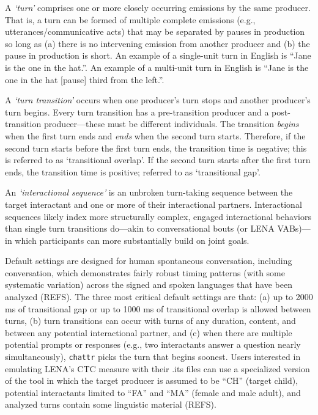 \documentclass[10pt, letterpaper]{article}
\begin{document}
A \emph{`turn'} comprises one or more closely occurring emissions by the
same producer. That is, a turn can be formed of multiple complete
emissions (e.g., utterances/communicative acts) that may be separated by
pauses in production so long as (a) there is no intervening emission
from another producer and (b) the pause in production is short. An
example of a single-unit turn in English is ``Jane is the one in the
hat.''. An example of a multi-unit turn in English is ``Jane is the one
in the hat {[}pause{]} third from the left.''.

A \emph{`turn transition'} occurs when one producer's turn stops and
another producer's turn begins. Every turn transition has a
pre-transition producer and a post-transition producer---these must be
different individuals. The transition \emph{begins} when the first turn
ends and \emph{ends} when the second turn starts. Therefore, if the
second turn starts before the first turn ends, the transition time is
negative; this is referred to as `transitional overlap'. If the second
turn starts after the first turn ends, the transition time is positive;
referred to as `transitional gap'.

An \emph{`interactional sequence'} is an unbroken turn-taking sequence
between the target interactant and one or more of their interactional
partners. Interactional sequences likely index more structurally
complex, engaged interactional behaviors than single turn transitions
do---akin to conversational bouts (or LENA VABs)---in which participants
can more substantially build on joint goals.

Default settings are designed for human spontaneous conversation,
including conversation, which demonstrates fairly robust timing patterns
(with some systematic variation) across the signed and spoken languages
that have been analyzed (REFS). The three most critical default settings
are that: (a) up to 2000 ms of transitional gap or up to 1000 ms of
transitional overlap is allowed between turns, (b) turn transitions can
occur with turns of any duration, content, and between any potential
interactional partner, and (c) when there are multiple potential prompts
or responses (e.g., two interactants answer a question nearly
simultaneously), \texttt{chattr} picks the turn that begins soonest.
Users interested in emulating LENA's CTC measure with their .its files
can use a specialized version of the tool in which the target producer
is assumed to be ``CH'' (target child), potential interactants limited
to ``FA'' and ``MA'' (female and male adult), and analyzed turns contain
some linguistic material (REFS).
\end{document}
